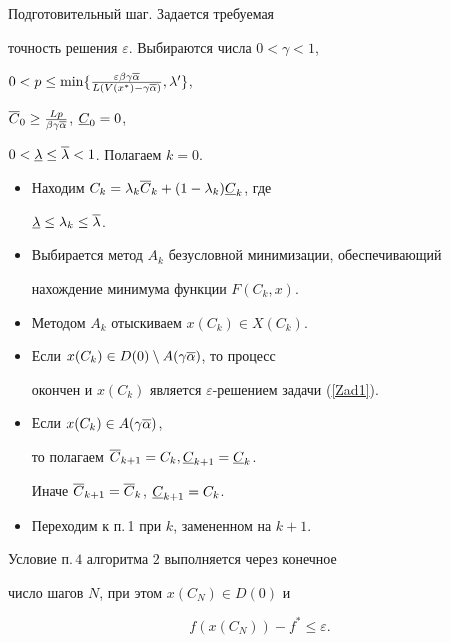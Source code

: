 \begin{alg}


Подготовительный шаг. Задается требуемая


точность решения $\varepsilon$. Выбираются числа $0<\gamma<1$,


$0<p\leq\min\{\frac{\varepsilon\beta\gamma\o\alpha}


{L(V(x^*)-\gamma\o\alpha)},\lambda'\}$,


$\overline C_0\geq\frac{Lp}{\beta\gamma\overline\alpha}$, $\underline C_0=0$,


$0<\underline\lambda\leq\overline\lambda<1$. Полагаем $k=0$.


\begin{itemize}


\item[1.] Находим $C_k=\lambda_k\overline C_k+(1-\lambda_k)\underline C_k$, где 


$\underline\lambda\leq\lambda_k\leq\overline\lambda$.


\item[2.] Выбирается метод $A_k$ безусловной минимизации, обеспечивающий


нахождение минимума функции $F(C_k,x)$.


\item[3.] Методом $A_k$ отыскиваем $x(C_k)\in X(C_k)$.


\item[4.] Если $x(C_k)\in D(0)\setminus A(\gamma \overline\alpha)$, то процесс 


окончен и $x(C_k)$ является $\varepsilon$-решением задачи (\ref{Zad1}).


\item[5.] Если $x(C_k)\in A(\gamma \overline\alpha)$, 


то полагаем $\overline C_{k+1}=C_k, \underline C_{k+1}=\underline C_k$.


Иначе $\overline C_{k+1}=\overline C_k$, $\underline C_{k+1}=C_k$.


\item[6.] Переходим к п.\,1 при $k$, замененном на $k+1$.


\end{itemize}


\end{alg}





\begin{thm}


Условие п.\,$4$ алгоритма $2$ выполняется через конечное


число шагов $N$, при этом $x(C_N)\in D(0)$ и


$$




f(x(C_N))-f^*\leq\varepsilon.




$$


\end{thm}





